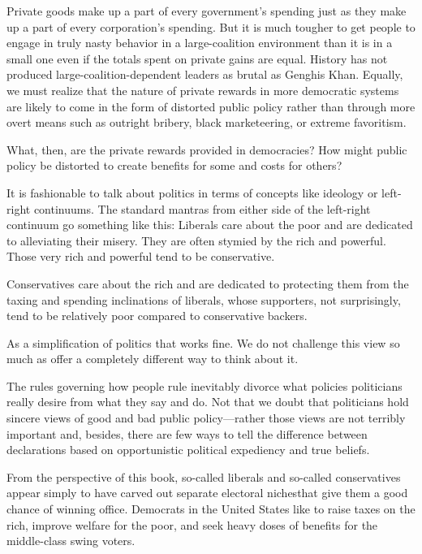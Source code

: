 \documentclass[10pt]{article}
\begin{document}
{\large Private goods make up a part of every government's spending just as they
make up a part of every corporation's spending. But it is much tougher to get
people to engage in truly nasty behavior in a large-coalition environment than it
is in a small one even if the totals spent on private gains are equal. History
has not produced large-coalition-dependent leaders as brutal as Genghis Khan.
Equally, we must realize that the nature of private rewards in more democratic
systems are likely to come in the form of distorted public policy rather than
through more overt means such as outright bribery, black marketeering, or extreme
favoritism.}

{\large What, then, are the private rewards provided in democracies? How might
public policy be distorted to create benefits for some and costs for others?}

{\large It is fashionable to talk about politics in terms of concepts like
ideology or left-right continuums. The standard mantras from either side of the
left-right continuum go something like this: Liberals care about the poor and are
dedicated to alleviating their misery. They are often stymied by the rich and
powerful. Those very rich and powerful tend to be conservative.}

{\large Conservatives care about the rich and are dedicated to protecting them
from the taxing and spending inclinations of liberals, whose supporters, not
surprisingly, tend to be relatively poor compared to conservative backers.}

{\large As a simplification of politics that works fine. We do not challenge
this view so much as offer a completely different way to think about it.}

{\large The rules governing how people rule inevitably divorce what policies
politicians really desire from what they say and do. Not that we doubt that
politicians hold sincere views of good and bad public policy---rather those views
are not terribly important and, besides, there are few ways to tell the
difference between declarations based on opportunistic political expediency and
true beliefs.}

{\large From the perspective of this book, so-called liberals and so-called
conservatives appear simply to have carved out separate electoral nichesthat give
them a good chance of winning office. Democrats in the United States like to
raise taxes on the rich, improve welfare for the poor, and seek heavy doses of
benefits for the middle-class swing voters.}
\end{document}
